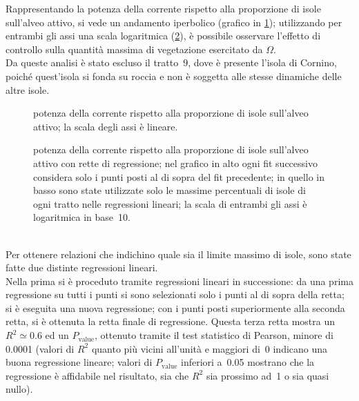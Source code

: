 Rappresentando la potenza della corrente rispetto alla proporzione di isole sull'alveo attivo, si vede un andamento iperbolico (grafico in \cref{graph:omega-area-percentuale-linear}); utilizzando per entrambi gli assi una scala logaritmica (\cref{graph:omega-area-percentuale}), è possibile osservare l'effetto di controllo sulla quantità massima di vegetazione esercitato da $\Omega$.
\\
Da queste analisi è stato escluso il tratto~9, dove è presente l'isola di Cornino, poiché quest'isola si fonda su roccia e non è soggetta alle stesse dinamiche delle altre isole.
%
\begin{figure}
	\centering
	
	\caption[potenza della corrente rispetto alla proporzione di isole sull'alveo attivo, grafico lineare]{potenza della corrente rispetto alla proporzione di isole sull'alveo attivo; la scala degli assi è lineare.}
	\label{graph:omega-area-percentuale-linear}
\end{figure}
%
\begin{figure}
	\centering
	
	\caption[potenza della corrente rispetto alla proporzione di isole sull'alveo attivo, grafici bilogaritmici]{potenza della corrente rispetto alla proporzione di isole sull'alveo attivo con rette di regressione; nel grafico in alto ogni fit successivo considera solo i punti posti al di sopra del fit precedente; in quello in basso sono state utilizzate solo le massime percentuali di isole di ogni tratto nelle regressioni lineari; la scala di entrambi gli assi è logaritmica in base~\num{10}.}
	\label{graph:omega-area-percentuale}
\end{figure}
%
%	
%
\\
Per ottenere relazioni che indichino quale sia il limite massimo di isole, sono state fatte due distinte regressioni lineari.
\\
Nella prima si è proceduto tramite regressioni lineari in successione: da una prima regressione su tutti i punti si sono selezionati solo i punti al di sopra della retta; si è eseguita una nuova regressione; con i punti posti superiormente alla seconda retta, si è ottenuta la retta finale di regressione.
Questa terza retta mostra un $R^2 \simeq 0.6$ ed un $P_\mathrm{value}$, ottenuto tramite il test statistico di Pearson, minore di \num{0.0001} (valori di $R^2$ quanto più vicini all'unità e maggiori di~\num{0} indicano una buona regressione lineare; valori di $P_\mathrm{value}$ inferiori a~\num{0.05} mostrano che la regressione è affidabile nel risultato, sia che $R^2$ sia prossimo ad~\num{1} o sia quasi nullo).
